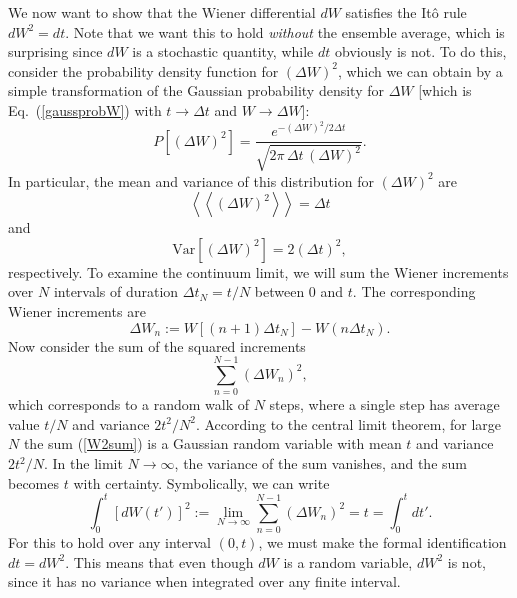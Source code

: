 \documentclass[aps,twocolumn,superscriptaddress,footinbib,floatfix,showpacs]{revtex4}
\newcommand{\dlangle}{\left\langle\!\left\langle}
\newcommand{\drangle}{\right\rangle\!\right\rangle}
\def\dexpct#1{\dlangle{#1}\drangle}
\begin{document}
We now want to show that the Wiener differential $dW$ satisfies 
the It\^o rule $dW^2=dt$.  Note that we want this to hold 
\textit{without} the ensemble average, which is surprising since
$dW$ is a stochastic quantity, while $dt$ obviously is not.
To do this, consider the probability density function for $(\Delta W)^2$,
which we can obtain by a simple transformation of the Gaussian
probability density for $\Delta W$ [which is Eq.~(\ref{gaussprobW})
with $t\longrightarrow\Delta t$ and $W\longrightarrow\Delta W$]:
\begin{equation}
  P\left[(\Delta W)^2\right] = 
   \frac{e^{-(\Delta W)^2/2\Delta t}}{\sqrt{2\pi\,\Delta t\,(\Delta W)^2}}.
\end{equation}
In particular, the mean and variance of this distribution for $(\Delta W)^2$ are
\begin{equation}
  \dexpct{(\Delta W)^2} = \Delta t
\end{equation}
and 
\begin{equation}
  \textrm{Var}\left[(\Delta W)^2\right] = 2(\Delta t)^2,
\end{equation}
respectively.
To examine the continuum limit, we will sum the Wiener increments over
$N$ intervals of duration $\Delta t_N = t/N$ between $0$ and $t$. 
The corresponding Wiener increments are
\begin{equation}
  \Delta W_n := W[(n+1)\Delta t_N] - W(n\Delta t_N).
\end{equation}
Now consider the sum of the squared increments
\begin{equation}
  \sum_{n=0}^{N-1}(\Delta W_n)^2,
  \label{W2sum}
\end{equation}
which corresponds to a random walk of $N$ steps, where a single
step has average value $t/N$ and variance $2t^2/N^2$.
According to the central limit theorem, for large $N$ the
sum (\ref{W2sum}) is a Gaussian random variable with mean $t$ and
variance $2t^2/N$.
In the limit $N\longrightarrow \infty$, the variance of the
sum vanishes, and the sum becomes $t$ with certainty.
Symbolically, we can write
\begin{equation}
  \int_0^t [dW(t')]^2 :=\lim_{N\rightarrow\infty}\sum_{n=0}^{N-1}
     (\Delta W_n)^2 = t = \int_0^t dt'.
\end{equation}
For this to hold over any interval $(0,t)$, we must make the 
formal identification $dt=dW^2$.
This means that even though $dW$ is a random variable, $dW^2$ is not,
since it has no variance when integrated over any finite interval.
\end{document}

